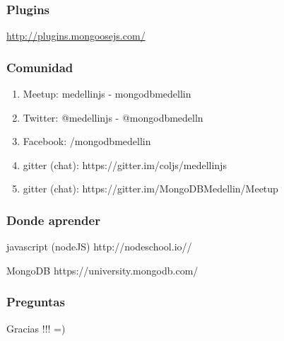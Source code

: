 \documentclass{beamer}
\begin{document}
\begin{frame}
\frametitle{Plugins}
{\color{blue}\url{http://plugins.mongoosejs.com/}}
\end{frame}

\begin{frame}
\frametitle{Comunidad}
\begin{enumerate}
\item Meetup: medellinjs  - mongodbmedellin
\pause
\item Twitter: @medellinjs - @mongodbmedelln
\pause
\item Facebook: /mongodbmedellin
\pause
\item gitter (chat): https://gitter.im/coljs/medellinjs
\pause
\item gitter (chat): https://gitter.im/MongoDBMedellin/Meetup
\end{enumerate}
\end{frame}
\begin{frame}
\frametitle{Donde aprender}
\footnotesize{
\begin{thebibliography}{99} %
 javascript (nodeJS)
\newblock http://nodeschool.io//
\end{thebibliography}
}

\footnotesize{
\begin{thebibliography}{99} %
 MongoDB
\newblock https://university.mongodb.com/
\end{thebibliography}
}
\end{frame}

\begin{frame}
\frametitle{Preguntas}
\end{frame}

\begin{frame}
\Huge{\centerline{Gracias !!! =)}}
\end{frame}
\end{document}
